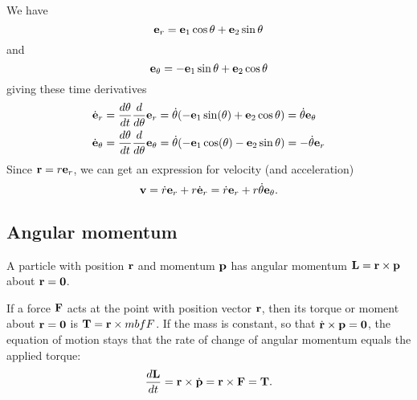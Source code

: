\documentclass[10pt, a4paper]{article}
\begin{document}
We have
\[
\mathbf{e}_r = \mathbf{e}_1\cos{\theta} + \mathbf{e}_2\sin{\theta}
\]
and
\[
\mathbf{e}_{\theta} = -\mathbf{e}_1\sin{\theta} + \mathbf{e}_2\cos{\theta}
\]
giving these time derivatives
\begin{align*}
    \dot{\mathbf{e}}_r &= \frac{d\theta}{dt}\frac{d}{d\theta}\mathbf{e}_r = \dot{\theta}(-\mathbf{e}_1\sin(\theta) + \mathbf{e}_2\cos{\theta}) = \dot{\theta}\mathbf{e}_{\theta} \\
    \dot{\mathbf{e}}_{\theta} &= \frac{d\theta}{dt}\frac{d}{d\theta}\mathbf{e}_{\theta} = \dot{\theta}(-\mathbf{e}_1\cos(\theta) - \mathbf{e}_2\sin{\theta}) = -\dot{\theta}\mathbf{e}_r
\end{align*}
Since $\mathbf{r} = r\mathbf{e}_r$,
we can get an expression for velocity
(and acceleration)
\[
\mathbf{v} = \dot{r}\mathbf{e}_r + r\dot{\mathbf{e}}_r = \dot{r}\mathbf{e}_r + r\dot{\theta}\mathbf{e}_{\theta}.
\]

\subsection{Angular momentum}
A particle with position $\mathbf{r}$ and momentum $\mathbf{p}$ has angular momentum $\mathbf{L} = \mathbf{r} \times \mathbf{p}$ about $\mathbf{r} = \mathbf{0}$.

If a force $\mathbf{F}$ acts at the point with position vector $\mathbf{r}$,
then its torque or moment about $\mathbf{r} = \mathbf{0}$ is $\mathbf{T} = \mathbf{r} \times mbf{F}$.
If the mass is constant,
so that $\dot{\mathbf{r}} \times \mathbf{p} = \mathbf{0}$,
the equation of motion stays that the rate of change of angular momentum equals the applied torque:
\[
\frac{d\mathbf{L}}{dt} = \mathbf{r} \times \dot{\mathbf{p}} = \mathbf{r} \times \mathbf{F} = \mathbf{T}.
\]
\end{document}

